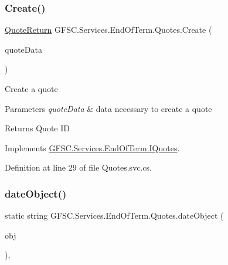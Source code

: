 \subsubsection{\texorpdfstring{Create()}{Create()}}
{\footnotesize\ttfamily \mbox{\hyperlink{class_g_f_s_c_1_1_services_1_1_end_of_term_1_1_quote_return}{Quote\+Return}} G\+F\+S\+C.\+Services.\+End\+Of\+Term.\+Quotes.\+Create (\begin{DoxyParamCaption}\item[{\mbox{\hyperlink{class_g_f_s_c_1_1_services_1_1_end_of_term_1_1_quote_request}{Quote\+Request}}}]{quote\+Data }\end{DoxyParamCaption})}



Create a quote 


\begin{DoxyParams}{Parameters}
{\em quote\+Data} & data necessary to create a quote\\
\hline
\end{DoxyParams}
\begin{DoxyReturn}{Returns}
Quote ID
\end{DoxyReturn}


Implements \mbox{\hyperlink{interface_g_f_s_c_1_1_services_1_1_end_of_term_1_1_i_quotes_a7290f204a4faa7f07a03b64d32a1617e}{G\+F\+S\+C.\+Services.\+End\+Of\+Term.\+I\+Quotes}}.



Definition at line 29 of file Quotes.\+svc.\+cs.

\mbox{\label{class_g_f_s_c_1_1_services_1_1_end_of_term_1_1_quotes_a7962fb9da488a4c449c5a832402ba20e}} 
\subsubsection{\texorpdfstring{date\+Object()}{dateObject()}}
{\footnotesize\ttfamily static string G\+F\+S\+C.\+Services.\+End\+Of\+Term.\+Quotes.\+date\+Object (\begin{DoxyParamCaption}\item[{object}]{obj }\end{DoxyParamCaption})\hspace{0.3cm}{\ttfamily [static]}, {\ttfamily [private]}}



